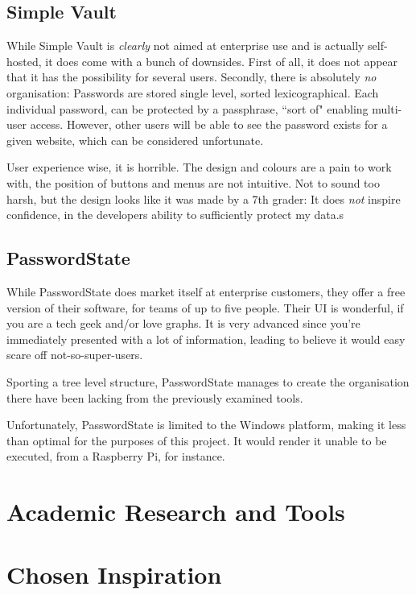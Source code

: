 		\subsection{Simple Vault}
			While Simple Vault is \emph{clearly} not aimed at enterprise use and is actually self-hosted, it does come with a bunch of downsides. First of all, it does not appear that it has the possibility for several users. Secondly, there is absolutely \emph{no} organisation: Passwords are stored single level, sorted lexicographical. Each individual password, can be protected by a passphrase, ``sort of" enabling multi-user access. However, other users will be able to see the password exists for a given website, which can be considered unfortunate.

			User experience wise, it is horrible. The design and colours are a pain to work with, the position of buttons and menus are not intuitive. Not to sound too harsh, but the design looks like it was made by a 7th grader: It does \emph{not} inspire confidence, in the developers ability to sufficiently protect my data.s

		\subsection{PasswordState}
			While PasswordState does market itself at enterprise customers, they offer a free version of their software, for teams of up to five people. Their UI is wonderful, if you are a tech geek and/or love graphs. It is very advanced since you're immediately presented with a lot of information, leading to believe it would easy scare off not-so-super-users.

			Sporting a tree level structure, PasswordState manages to create the organisation there have been lacking from the previously examined tools.

			Unfortunately, PasswordState is limited to the Windows platform, making it less than optimal for the purposes of this project. It would render it unable to be executed, from a Raspberry Pi, for instance.







	\section{Academic Research and Tools}
	\section{Chosen Inspiration}